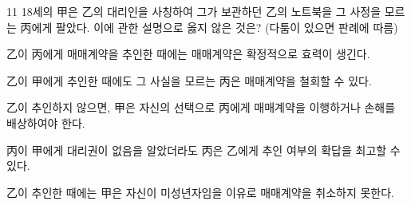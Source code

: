 \begin{question}{11}
18세의 甲은 乙의 대리인을 사칭하여 그가 보관하던 乙의 노트북을 그 사정을 모르는 丙에게 팔았다. 이에 관한 설명으로 옳지 않은 것은? (다툼이 있으면 판례에 따름)
\begin{choices}
  \item 乙이 丙에게 매매계약을 추인한 때에는 매매계약은 확정적으로 효력이 생긴다.
  \item 乙이 甲에게 추인한 때에도 그 사실을 모르는 丙은 매매계약을 철회할 수 있다.
  \item 乙이 추인하지 않으면, 甲은 자신의 선택으로 丙에게 매매계약을 이행하거나 손해를 배상하여야 한다.
  \item 丙이 甲에게 대리권이 없음을 알았더라도 丙은 乙에게 추인 여부의 확답을 최고할 수 있다.
  \item 乙이 추인한 때에는 甲은 자신이 미성년자임을 이유로 매매계약을 취소하지 못한다.
\end{choices}
\end{question}
